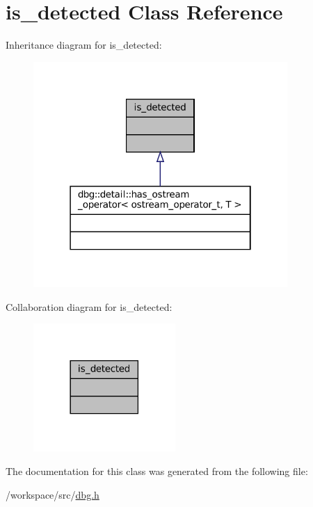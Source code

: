 \hypertarget{classis__detected}{}\section{is\+\_\+detected Class Reference}
\label{classis__detected}


Inheritance diagram for is\+\_\+detected\+:
\nopagebreak
\begin{figure}[H]
\begin{center}
\leavevmode
\includegraphics[width=274pt]{classis__detected__inherit__graph}
\end{center}
\end{figure}


Collaboration diagram for is\+\_\+detected\+:
\nopagebreak
\begin{figure}[H]
\begin{center}
\leavevmode
\includegraphics[width=153pt]{classis__detected__coll__graph}
\end{center}
\end{figure}


The documentation for this class was generated from the following file\+:\begin{DoxyCompactItemize}
\item 
/workspace/src/\hyperlink{dbg_8h}{dbg.\+h}\end{DoxyCompactItemize}
